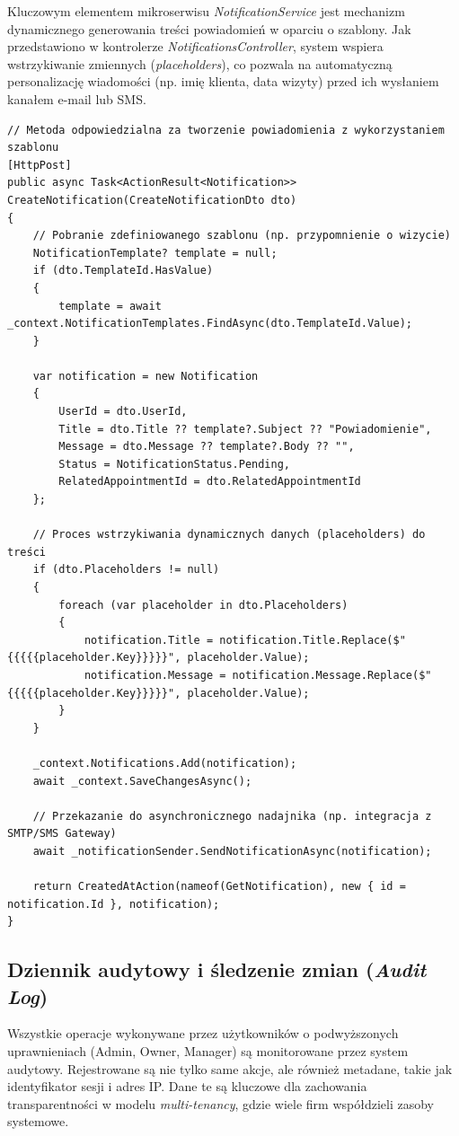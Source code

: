 Kluczowym elementem mikroserwisu \textit{NotificationService} jest mechanizm dynamicznego generowania treści powiadomień w oparciu o szablony. Jak przedstawiono w kontrolerze \textit{NotificationsController}, system wspiera wstrzykiwanie zmiennych (\textit{placeholders}), co pozwala na automatyczną personalizację wiadomości (np. imię klienta, data wizyty) przed ich wysłaniem kanałem e-mail lub SMS.



\begin{lstlisting}[language={[Sharp]C}, caption={Mechanizm personalizacji powiadomień i obsługi szablonów (NotificationsController.cs)}]
// Metoda odpowiedzialna za tworzenie powiadomienia z wykorzystaniem szablonu
[HttpPost]
public async Task<ActionResult<Notification>> CreateNotification(CreateNotificationDto dto)
{
    // Pobranie zdefiniowanego szablonu (np. przypomnienie o wizycie)
    NotificationTemplate? template = null;
    if (dto.TemplateId.HasValue)
    {
        template = await _context.NotificationTemplates.FindAsync(dto.TemplateId.Value);
    }

    var notification = new Notification
    {
        UserId = dto.UserId,
        Title = dto.Title ?? template?.Subject ?? "Powiadomienie",
        Message = dto.Message ?? template?.Body ?? "",
        Status = NotificationStatus.Pending,
        RelatedAppointmentId = dto.RelatedAppointmentId
    };

    // Proces wstrzykiwania dynamicznych danych (placeholders) do treści
    if (dto.Placeholders != null)
    {
        foreach (var placeholder in dto.Placeholders)
        {
            notification.Title = notification.Title.Replace($"{{{{{placeholder.Key}}}}}", placeholder.Value);
            notification.Message = notification.Message.Replace($"{{{{{placeholder.Key}}}}}", placeholder.Value);
        }
    }

    _context.Notifications.Add(notification);
    await _context.SaveChangesAsync();

    // Przekazanie do asynchronicznego nadajnika (np. integracja z SMTP/SMS Gateway)
    await _notificationSender.SendNotificationAsync(notification);

    return CreatedAtAction(nameof(GetNotification), new { id = notification.Id }, notification);
}
\end{lstlisting}

\subsection{Dziennik audytowy i śledzenie zmian (\textit{Audit Log})}
Wszystkie operacje wykonywane przez użytkowników o podwyższonych uprawnieniach (Admin, Owner, Manager) są monitorowane przez system audytowy. Rejestrowane są nie tylko same akcje, ale również metadane, takie jak identyfikator sesji i adres IP. Dane te są kluczowe dla zachowania transparentności w modelu \textit{multi-tenancy}, gdzie wiele firm współdzieli zasoby systemowe.



